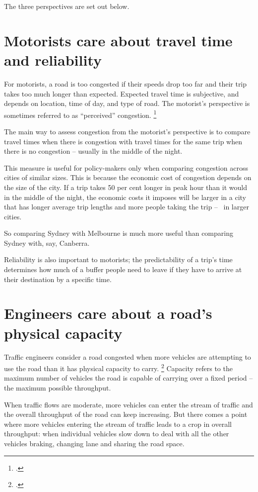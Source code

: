 \documentclass{grattan}
\begin{document}
\label{para:three-perspectives-on-congestion--intro}
The three perspectives are set out below.

\section{Motorists care about travel time and reliability}\label{subsec:road-users-perspective}
For motorists, a road is too congested if their speeds drop too far and their trip takes too much longer than expected. Expected travel time is subjective, and depends on location, time of day, and type of road. The motorist's perspective is sometimes referred to as “perceived” congestion.%
    \footcite[][108]{Falcocchio-and-Levinson-congestion-a-concise-guide}

The main way to assess congestion from the motorist's perspective is to compare travel times when there is congestion with travel times for the same trip when there is no congestion – usually in the middle of the night.

This measure is useful for policy-makers only when comparing congestion across cities of similar sizes.
This is because the economic cost of congestion depends on the size of the city.
If a trip takes 50 per cent longer in peak hour than it would in the middle of the night, the economic costs it imposes will be larger in a city that has longer average trip lengths and more people taking the trip – \ie~in larger cities.

So comparing Sydney with Melbourne is much more useful than comparing Sydney with, say, Canberra.

Reliability is also important to motorists; the predictability of a trip's time determines how much of a buffer people need to leave if they have to arrive at their destination by a specific time.

\section{Engineers care about a road's physical capacity}\label{subsec:engineers-perspective}
Traffic engineers consider a road congested when more vehicles are attempting to use the road than it has physical capacity to carry.%
    \footcite[][7]{Wallis-Lupton-2013-NZ-Transport-Agency}
Capacity refers to the maximum number of vehicles the road is capable of carrying over a fixed period – the maximum possible throughput.

When traffic flows are moderate, more vehicles can enter the stream of traffic and the overall throughput of the road can keep increasing.
But there comes a point where more vehicles entering the stream of traffic leads to a crop in overall throughput: when individual vehicles slow down to deal with all the other vehicles braking, changing lane and sharing the road space.
\end{document}
